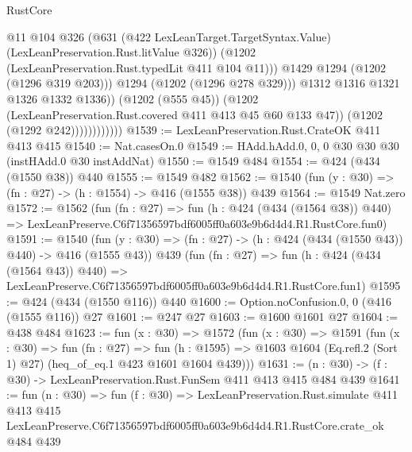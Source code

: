 \begin{lexlean}{RustCore}
\begin{coremodule}
                                  @11
                                  @104
                                  @326
                                  (@631
                                    (@422 LexLeanTarget.TargetSyntax.Value)
                                    (LexLeanPreservation.Rust.litValue @326))
                                  (@1202 (LexLeanPreservation.Rust.typedLit @411 @104 @11)))
                                @1429
                                @1294
                                (@1202 (@1296 @319 @203)))
                              @1294
                              (@1202 (@1296 @278 @329)))
                            @1312
                            @1316
                            @1321
                            @1326
                            @1332
                            @1336))
                        (@1202 (@555 @45))
                        (@1202 (LexLeanPreservation.Rust.covered @411 @413 @45 @60 @133 @47))
                        (@1202 (@1292 @242))))))))))))
@1539 := LexLeanPreservation.Rust.CrateOK @411 @413 @415
@1540 := Nat.casesOn.{0}
@1549 := HAdd.hAdd.{0, 0, 0} @30 @30 @30 (instHAdd.{0} @30 instAddNat)
@1550 := @1549 @484
@1554 := @424 (@434 (@1550 @38)) @440
@1555 := @1549 @482
@1562 := @1540 (fun (y : @30) => (fn : @27) -> (h : @1554) -> @416 (@1555 @38)) @439
@1564 := @1549 Nat.zero
@1572 := @1562
    (fun (fn : @27) =>
    fun (h : @424 (@434 (@1564 @38)) @440) =>
    LexLeanPreserve.C6f71356597bdf6005ff0a603e9b6d4d4.R1.RustCore.fun0)
@1591 := @1540
    (fun (y : @30) => (fn : @27) -> (h : @424 (@434 (@1550 @43)) @440) -> @416 (@1555 @43))
    @439
    (fun (fn : @27) =>
    fun (h : @424 (@434 (@1564 @43)) @440) =>
    LexLeanPreserve.C6f71356597bdf6005ff0a603e9b6d4d4.R1.RustCore.fun1)
@1595 := @424 (@434 (@1550 @116)) @440
@1600 := Option.noConfusion.{0, 0} (@416 (@1555 @116)) @27
@1601 := @247 @27
@1603 := @1600 @1601 @27
@1604 := @438 @484
@1623 := fun (x : @30) =>
  @1572
    (fun (x : @30) =>
    @1591
      (fun (x : @30) =>
      fun (fn : @27) =>
      fun (h : @1595) =>
      @1603 @1604 (Eq.refl.{2} (Sort 1) @27) (heq_of_eq.{1} @423 @1601 @1604 @439)))
@1631 := (n : @30) -> (f : @30) -> LexLeanPreservation.Rust.FunSem @411 @413 @415 @484 @439
@1641 := fun (n : @30) =>
  fun (f : @30) =>
  LexLeanPreservation.Rust.simulate
    @411
    @413
    @415
    LexLeanPreserve.C6f71356597bdf6005ff0a603e9b6d4d4.R1.RustCore.crate_ok
    @484
    @439
\end{coremodule}
\end{lexlean}
